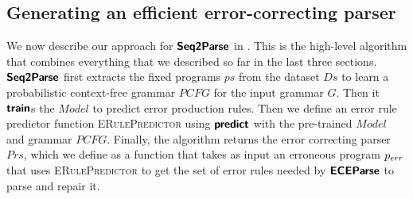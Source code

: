 \subsection{Generating an efficient error-correcting parser}
\label{sec:whole-system:building-ecp}



We now describe our approach for $\bm{\mathsf{Seq2Parse}}$ in . This is
the high-level algorithm that combines everything that we described so far in
the last three sections. $\bm{\mathsf{Seq2Parse}}$ first extracts the fixed programs $ps$
from the dataset $Ds$ to learn a probabilistic context-free grammar $PCFG$ for
the input grammar $G$. Then it $\bm{\mathsf{train}}$s the $Model$ to predict error
production rules. Then we define an error rule predictor function
\textsc{ERulePredictor} using $\bm{\mathsf{predict}}$ with the pre-trained $Model$ and
grammar $PCFG$. Finally, the algorithm returns the error correcting parser
$Prs$, which we define as a function that takes as input an erroneous program
$p_{err}$ that uses \textsc{ERulePredictor} to get the set of error rules needed
by $\bm{\mathsf{ECEParse}}$ to parse and repair it.

